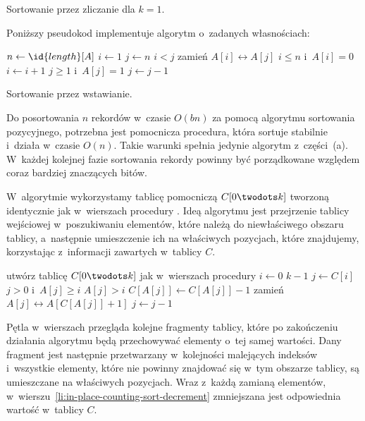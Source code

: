 
\subproblem %
Sortowanie przez zliczanie dla $k=1$.

\subproblem %
Poniższy pseudokod implementuje algorytm o~zadanych własnościach:
\begin{codebox}
\li	$n\gets\id{length}[A]$
\li	$i\gets1$
\li	$j\gets n$
\li	\While $i<j$
\li		\Do
			zamień $A[i]\leftrightarrow A[j]$
\li			\While $i\le n$ i~$A[i]=0$
\li				\Do $i\gets i+1$
				\End
\li			\While $j\ge1$ i~$A[j]=1$
\li				\Do $j\gets j-1$
				\End
		\End
\end{codebox}

\subproblem %
Sortowanie przez wstawianie.

\subproblem %
Do posortowania $n$ rekordów  w~czasie $O(bn)$ za pomocą algorytmu sortowania pozycyjnego, potrzebna jest pomocnicza procedura, która sortuje stabilnie i~działa w~czasie $O(n)$. Takie warunki spełnia jedynie algorytm z~części~(a). W~każdej kolejnej fazie sortowania rekordy powinny być porządkowane względem coraz bardziej znaczących bitów.

\subproblem %
W~algorytmie wykorzystamy tablicę pomocniczą $C[0\twodots k]$ tworzoną identycznie jak w~wierszach  procedury . Ideą algorytmu jest przejrzenie tablicy wejściowej w~poszukiwaniu elementów, które należą do niewłaściwego obszaru tablicy, a~następnie umieszczenie ich na właściwych pozycjach, które znajdujemy, korzystając z~informacji zawartych w~tablicy $C$.
\begin{codebox}
\li	utwórz tablicę $C[0\twodots k]$ jak w~wierszach  procedury  
\li	\For $i\gets0$ \To $k-1$ \label{li:in-place-counting-sort-for-begin}
\li		\Do
			$j\gets C[i]$
\li			\While $j>0$ i~$A[j]\ge i$ \label{li:in-place-counting-sort-while1-begin}
\li				\Do
					\While $A[j]>i$
\li						\Do
							$C[A[j]]\gets C[A[j]]-1$ \label{li:in-place-counting-sort-decrement}
\li							zamień $A[j]\leftrightarrow A[C[A[j]]+1]$ \label{li:in-place-counting-sort-swap}
						\End
\li					$j\gets j-1$
				\End \label{li:in-place-counting-sort-while1-end}
		\End \label{li:in-place-counting-sort-for-end}
\end{codebox}

Pętla  w~wierszach \twodashes{\ref{li:in-place-counting-sort-for-begin}}{\ref{li:in-place-counting-sort-for-end}} przegląda kolejne fragmenty tablicy, które po zakończeniu działania algorytmu będą przechowywać elementy o~tej samej wartości. Dany fragment jest następnie przetwarzany w~kolejności malejących indeksów i~wszystkie elementy, które nie powinny znajdować się w~tym obszarze tablicy, są umieszczane na właściwych pozycjach. Wraz z~każdą zamianą elementów, w~wierszu~\ref{li:in-place-counting-sort-decrement} zmniejszana jest odpowiednia wartość w~tablicy $C$.

